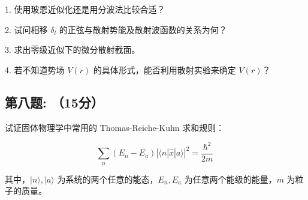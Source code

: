 1. 使用玻恩近似化还是用分波法比较合适？

2. 试问相移 $\delta_l$ 的正弦与散射势能及散射波函数的关系为何？

3. 求出零级近似下的微分散射截面。

4. 若不知道势场 $V(r)$ 的具体形式，能否利用散射实验来确定 $V(r)$？
\subsection{第八题: （15分）}
试证固体物理学中常用的 Thomas-Reiche-Kuhn 求和规则：

\[\sum_n (E_n - E_a) \left| \langle n | \hat{x} | a \rangle \right|^2 = \frac{\hbar^2}{2m}~\]

其中，\(|n\rangle, |a\rangle\) 为系统的两个任意的能态，\(E_n, E_a\) 为任意两个能级的能量，\(m\) 为粒子的质量。
